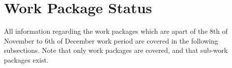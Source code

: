 \section{Work Package Status}



All information regarding the work packages which are apart of the 8th of November to 6th of December work period are covered in the following subsections. Note that only work packages are covered, and that sub-work packages exist.













